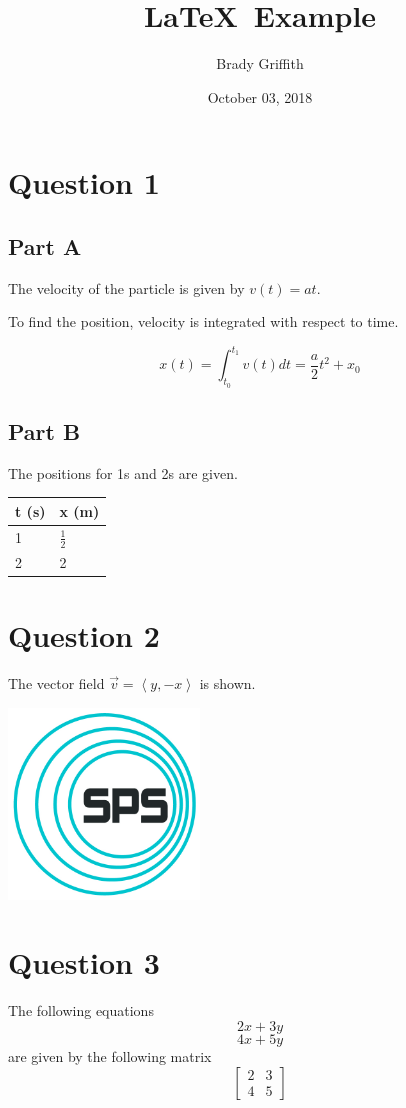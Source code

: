 \documentclass{article}
\title{\LaTeX \ Example}
\author{Brady Griffith}
\date{October 03, 2018}
\begin{document}
\maketitle
\newpage

\section*{Question 1}
\subsection*{Part A}
The velocity of the particle is given by $v(t) = at$.

To find the position, velocity is integrated with respect to time.

$$ x(t) = \int_{t_0}^{t_1} v(t) dt = \frac{a}{2} t^2 + x_0 $$

\subsection*{Part B}
The positions for 1s and 2s are given. \\
\begin{tabular}{ l | l }
  t (s) & x (m) \\ \hline
  1 & $\frac{1}{2}$ \\
  2 & 2 \\
\end{tabular}

\section*{Question 2}
The vector field $\vec{v} = \left< y, -x \right>$ is shown.

\includegraphics[width=2in]{example}

\section*{Question 3}
The following equations
$$ 2x + 3y $$
$$ 4x + 5y $$
are given by the following matrix
\[
 \begin{bmatrix}
   2 & 3 \\
   4 & 5
 \end{bmatrix}
\]
\end{document}
